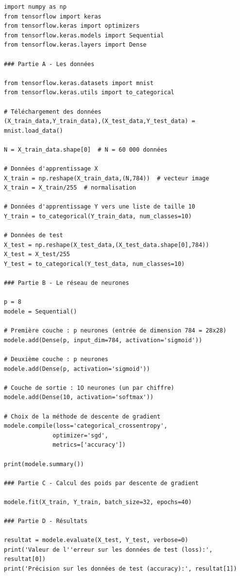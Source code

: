 \documentclass[11pt,class=report,crop=false]{standalone}
\begin{document}
\begin{lstlisting}
import numpy as np
from tensorflow import keras
from tensorflow.keras import optimizers
from tensorflow.keras.models import Sequential
from tensorflow.keras.layers import Dense

### Partie A - Les données

from tensorflow.keras.datasets import mnist
from tensorflow.keras.utils import to_categorical

# Téléchargement des données
(X_train_data,Y_train_data),(X_test_data,Y_test_data) = mnist.load_data()

N = X_train_data.shape[0]  # N = 60 000 données

# Données d'apprentissage X
X_train = np.reshape(X_train_data,(N,784))  # vecteur image
X_train = X_train/255  # normalisation

# Données d'apprentissage Y vers une liste de taille 10
Y_train = to_categorical(Y_train_data, num_classes=10) 

# Données de test
X_test = np.reshape(X_test_data,(X_test_data.shape[0],784))
X_test = X_test/255
Y_test = to_categorical(Y_test_data, num_classes=10)

### Partie B - Le réseau de neurones

p = 8
modele = Sequential()

# Première couche : p neurones (entrée de dimension 784 = 28x28)
modele.add(Dense(p, input_dim=784, activation='sigmoid'))

# Deuxième couche : p neurones
modele.add(Dense(p, activation='sigmoid'))

# Couche de sortie : 1O neurones (un par chiffre)
modele.add(Dense(10, activation='softmax'))

# Choix de la méthode de descente de gradient
modele.compile(loss='categorical_crossentropy', 
              optimizer='sgd',  
              metrics=['accuracy'])

print(modele.summary())

### Partie C - Calcul des poids par descente de gradient

modele.fit(X_train, Y_train, batch_size=32, epochs=40)

### Partie D - Résultats

resultat = modele.evaluate(X_test, Y_test, verbose=0)
print('Valeur de l''erreur sur les données de test (loss):', resultat[0])
print('Précision sur les données de test (accuracy):', resultat[1])
\end{lstlisting} 
\end{document}
